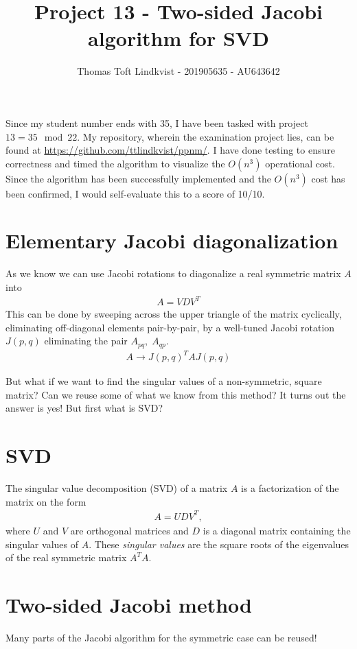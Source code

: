 \documentclass{article}
\title{Project 13 - Two-sided Jacobi algorithm for SVD}
\author{Thomas Toft Lindkvist - 201905635 - AU643642}
\date{}
\begin{document}
    \maketitle
    \noindent
    Since my student number ends with 35, I have been tasked with project $13 = 35 \mod 22 $.
    My repository, wherein the examination project lies, can be found at \url{https://github.com/ttlindkvist/ppnm/}.
    I have done testing to ensure correctness and timed the algorithm to visualize the $ O(n^3) $ operational cost. Since the algorithm has been successfully implemented and the $ O(n^3) $ cost has been confirmed, I would self-evaluate this to a score of 10/10.
    
    \section{Elementary Jacobi diagonalization}
    As we know we can use Jacobi rotations to diagonalize a real symmetric matrix $ A $ into
    \begin{align}
    	A = VDV^T
    \end{align}
	This can be done by sweeping across the upper triangle of the matrix cyclically, eliminating off-diagonal elements pair-by-pair, by a well-tuned Jacobi rotation $ J(p,q) $ eliminating the pair $ A_{pq},\;A_{qp} $.
	\begin{align}
		A \to J(p,q)^T A J(p,q)
	\end{align}
	
	But what if we want to find the singular values of a non-symmetric, square matrix? Can we reuse some of what we know from this method? It turns out the answer is yes! But first what is SVD?
	
	\section{SVD}
	The singular value decomposition (SVD) of a matrix $ A $ is a factorization of the matrix on the form
	\begin{align}
		A = UDV^T,
	\end{align}
	where $ U $ and $ V $ are orthogonal matrices and $ D $ is a diagonal matrix containing the singular values of $ A $. These \textit{singular values} are the square roots of the eigenvalues of the real symmetric matrix $ A^TA $.	
	
    
    \section{Two-sided Jacobi method}
    Many parts of the Jacobi algorithm for the symmetric case can be reused! 
\end{document}
